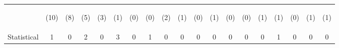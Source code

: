 \begin{tabular}{lcccccccccccccccccc}
 & \begin{footnotesize}(10)\end{footnotesize} & \begin{footnotesize}(8)\end{footnotesize} & \begin{footnotesize}(5)\end{footnotesize} & \begin{footnotesize}(3)\end{footnotesize} & \begin{footnotesize}(1)\end{footnotesize} & \begin{footnotesize}(0)\end{footnotesize} & \begin{footnotesize}(0)\end{footnotesize} & \begin{footnotesize}(2)\end{footnotesize} & \begin{footnotesize}(1)\end{footnotesize} & \begin{footnotesize}(0)\end{footnotesize} & \begin{footnotesize}(1)\end{footnotesize} & \begin{footnotesize}(0)\end{footnotesize} & \begin{footnotesize}(0)\end{footnotesize} & \begin{footnotesize}(1)\end{footnotesize} & \begin{footnotesize}(1)\end{footnotesize} & \begin{footnotesize}(0)\end{footnotesize} & \begin{footnotesize}(1)\end{footnotesize} & \begin{footnotesize}(1)\end{footnotesize}\\
\noalign{\smallskip}Statistical & 1 & 0 & 2 & 0 & 3 & 0 & 1 & 0 & 0 & 0 & 0 & 0 & 0 & 0 & 1 & 0 & 0 & 0\\

\end{tabular}
